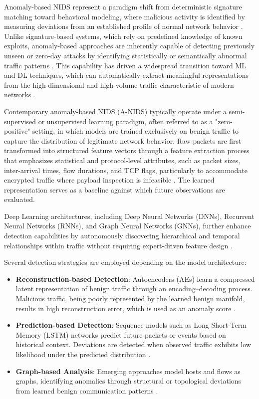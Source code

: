 Anomaly-based NIDS represent a paradigm shift from deterministic signature matching toward behavioral modeling, where malicious activity is identified by measuring deviations from an established profile of normal network behavior \cite{ayub2020model}. Unlike signature-based systems, which rely on predefined knowledge of known exploits, anomaly-based approaches are inherently capable of detecting previously unseen or zero-day attacks by identifying statistically or semantically abnormal traffic patterns \cite{he2023adversarial}. This capability has driven a widespread transition toward ML and DL techniques, which can automatically extract meaningful representations from the high-dimensional and high-volume traffic characteristic of modern networks \cite{sun2024gnn}.

Contemporary anomaly-based NIDS (A-NIDS) typically operate under a semi-supervised or unsupervised learning paradigm, often referred to as a "zero-positive" setting, in which models are trained exclusively on benign traffic to capture the distribution of legitimate network behavior. Raw packets are first transformed into structured feature vectors through a feature extraction process that emphasizes statistical and protocol-level attributes, such as packet sizes, inter-arrival times, flow durations, and TCP flags, particularly to accommodate encrypted traffic where payload inspection is infeasible \cite{han2021deepaid, he2023adversarial}. The learned representation serves as a baseline against which future observations are evaluated.

Deep Learning architectures, including Deep Neural Networks (DNNs), Recurrent Neural Networks (RNNs), and Graph Neural Networks (GNNs), further enhance detection capabilities by autonomously discovering hierarchical and temporal relationships within traffic without requiring expert-driven feature design \cite{zhao2025unified}.

Several detection strategies are employed depending on the model architecture:
\begin{itemize}
\item \textbf{Reconstruction-based Detection}: Autoencoders (AEs) learn a compressed latent representation of benign traffic through an encoding–decoding process. Malicious traffic, being poorly represented by the learned benign manifold, results in high reconstruction error, which is used as an anomaly score \cite{sarikaya2023raids}.
\item \textbf{Prediction-based Detection}: Sequence models such as Long Short-Term Memory (LSTM) networks predict future packets or events based on historical context. Deviations are detected when observed traffic exhibits low likelihood under the predicted distribution \cite{he2023adversarial}.
\item \textbf{Graph-based Analysis}: Emerging approaches model hosts and flows as graphs, identifying anomalies through structural or topological deviations from learned benign communication patterns \cite{zhao2025unified}.
\end{itemize}


